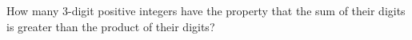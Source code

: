 How many 3-digit positive integers have the property that the sum of their digits is greater than the product of their digits?